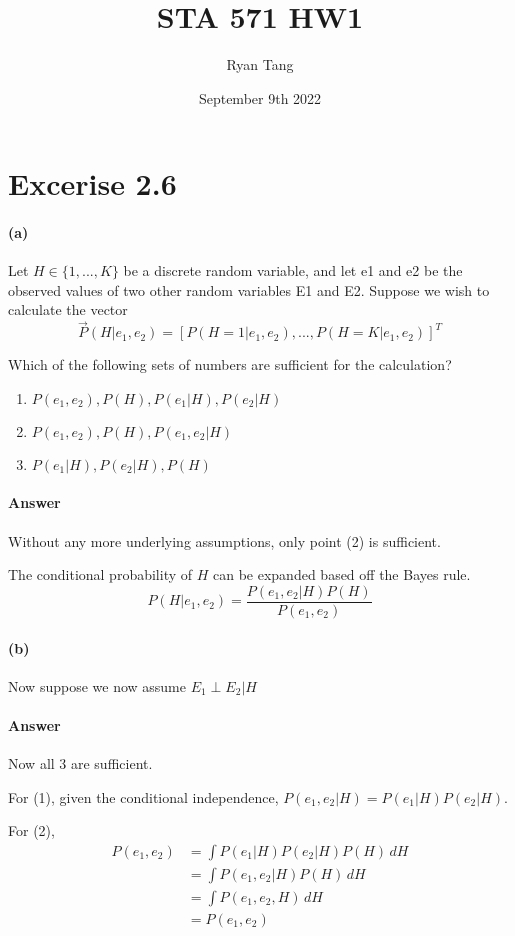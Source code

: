 \documentclass[12pt, letterpaper]{article}
\title{STA 571 HW1}
\author{Ryan Tang}
\date{September 9th 2022}
\begin{document}
\maketitle

\section{Excerise 2.6}
\paragraph{(a)}
Let $H \in \{1, . . . , K\}$ be a discrete random variable, and let e1 and e2 be the observed values of two 
other random variables E1 and E2. Suppose we wish to calculate the vector
\[
    \vec{P}(H|e_1, e_2) = [P(H = 1|e_1, e_2), . . . , P (H = K|e_1, e_2)]^T
\]

Which of the following sets of numbers are sufficient for the calculation?
\begin{enumerate}
    \item $P(e_1, e_2), P(H), P(e_1|H), P(e_2|H)$
    \item $P(e_1, e_2), P(H), P(e_1, e_2|H)$
    \item $P(e_1|H), P(e_2|H), P(H)$
\end{enumerate}

\paragraph{Answer}
Without any more underlying assumptions, only point (2) is sufficient.

The conditional probability of $H$ can be expanded based off the Bayes rule.
\[
    P(H|e_1, e_2) = \frac{P(e_1, e_2 | H)P(H)} {P(e_1, e_2)}
\]


\paragraph{(b)}
Now suppose we now assume $E_1 \perp E_2|H$

\paragraph{Answer}
Now all 3 are sufficient.

For (1), given the conditional independence, $P(e_1, e_2|H) = P(e_1|H) P(e_2|H)$.

For (2),
\begin{align*}
    P(e_1, e_2) &= \int P(e_1|H)P(e_2|H)P(H) \, dH \\
                &= \int P(e_1, e_2|H)P(H) \, dH \\
                &= \int P(e_1, e_2, H) \, dH \\
                &= P(e_1, e_2)
\end{align*}
\end{document}
